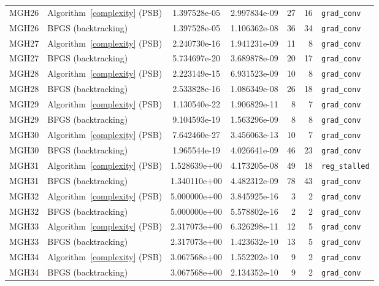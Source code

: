 \documentclass[11pt]{article}
\begin{document}
{\begin{longtable}{l l S[table-format=1.3e2] S[table-format=1.3e2] r r >{\raggedright\arraybackslash}p{2.2cm}}
MGH26 & Algorithm~\ref{complexity} (PSB) & 1.397528e-05 & 2.997834e-09 & 27 & 16 & \texttt{grad\_conv} \\
MGH26 & BFGS (backtracking) & 1.397528e-05 & 1.106362e-08 & 36 & 34 & \texttt{grad\_conv} \\
\midrule
MGH27 & Algorithm~\ref{complexity} (PSB) & 2.240730e-16 & 1.941231e-09 & 11 & 8 & \texttt{grad\_conv} \\
MGH27 & BFGS (backtracking) & 5.734697e-20 & 3.689878e-09 & 20 & 17 & \texttt{grad\_conv} \\
\midrule
MGH28 & Algorithm~\ref{complexity} (PSB) & 2.223149e-15 & 6.931523e-09 & 10 & 8 & \texttt{grad\_conv} \\
MGH28 & BFGS (backtracking) & 2.533828e-16 & 1.086349e-08 & 26 & 18 & \texttt{grad\_conv} \\
\midrule
MGH29 & Algorithm~\ref{complexity} (PSB) & 1.130540e-22 & 1.906829e-11 & 8 & 7 & \texttt{grad\_conv} \\
MGH29 & BFGS (backtracking) & 9.104593e-19 & 1.563296e-09 & 8 & 8 & \texttt{grad\_conv} \\
\midrule
MGH30 & Algorithm~\ref{complexity} (PSB) & 7.642460e-27 & 3.456063e-13 & 10 & 7 & \texttt{grad\_conv} \\
MGH30 & BFGS (backtracking) & 1.965544e-19 & 4.026641e-09 & 46 & 23 & \texttt{grad\_conv} \\
\midrule
MGH31 & Algorithm~\ref{complexity} (PSB) & 1.528639e+00 & 4.173205e-08 & 49 & 18 & \texttt{reg\_stalled} \\
MGH31 & BFGS (backtracking) & 1.340110e+00 & 4.482312e-09 & 78 & 43 & \texttt{grad\_conv} \\
\midrule
MGH32 & Algorithm~\ref{complexity} (PSB) & 5.000000e+00 & 3.845925e-16 & 3 & 2 & \texttt{grad\_conv} \\
MGH32 & BFGS (backtracking) & 5.000000e+00 & 5.578802e-16 & 2 & 2 & \texttt{grad\_conv} \\
\midrule
MGH33 & Algorithm~\ref{complexity} (PSB) & 2.317073e+00 & 6.326298e-11 & 12 & 5 & \texttt{grad\_conv} \\
MGH33 & BFGS (backtracking) & 2.317073e+00 & 1.423632e-10 & 13 & 5 & \texttt{grad\_conv} \\
\midrule
MGH34 & Algorithm~\ref{complexity} (PSB) & 3.067568e+00 & 1.552202e-10 & 9 & 2 & \texttt{grad\_conv} \\
MGH34 & BFGS (backtracking) & 3.067568e+00 & 2.134352e-10 & 9 & 2 & \texttt{grad\_conv} \\
\end{longtable}}
\FloatBarrier
\end{document}
